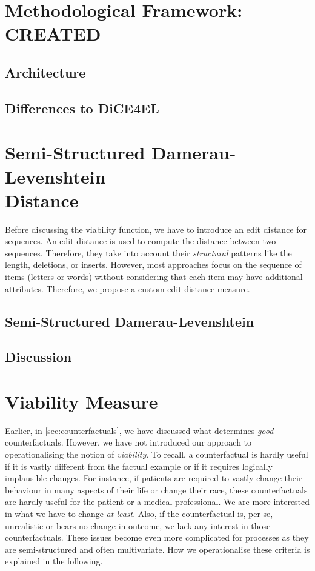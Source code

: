 \documentclass[12pt,a4paper]{report}
\begin{document}
\section{Methodological Framework: CREATED}
\label{sec:framework}
\subsection{Architecture}


\subsection{Differences to DiCE4EL}


\section{Semi-Structured Damerau-Levenshtein \\ Distance}
\label{sec:ssdld}
Before discussing the viability function, we have to introduce an edit distance for sequences. An edit distance is used to compute the distance between two sequences. Therefore, they take into account their \emph{structural} patterns like the length, deletions, or inserts. However, most approaches focus on the sequence of items (letters or words) without considering that each item may have additional attributes. Therefore, we propose a custom edit-distance measure. 

\subsection{Semi-Structured Damerau-Levenshtein}


\subsection{Discussion}


\section{Viability Measure}
\label{sec:viability}
Earlier, in \autoref{sec:counterfactuals}, we have discussed what determines \emph{good} counterfactuals. However, we have not introduced our approach to operationalising the notion of \emph{viability}. To recall, a counterfactual is hardly useful if it is vastly different from the factual example or if it requires logically implausible changes. For instance, if patients are required to vastly change their behaviour in many aspects of their life or change their race, these counterfactuals are hardly useful for the patient or a medical professional. We are more interested in what we have to change \emph{at least}. Also, if the counterfactual is, per se, unrealistic or bears no change in outcome, we lack any interest in those counterfactuals. These issues become even more complicated for processes as they are semi-structured and often multivariate. How we operationalise these criteria is explained in the following.
\end{document}

